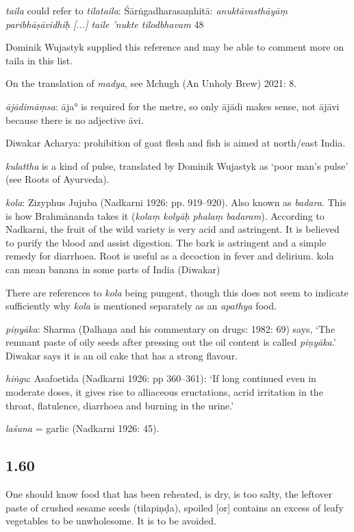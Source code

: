 \begin{ekdosis}
\begin{philcomm}[hp01_059]
\emph{taila} could refer to \emph{tilataila}:
Śārṅgadharasaṃhitā:
\emph{anuktāvasthāyāṃ paribhāṣāvidhiḥ [...] taile ’nukte tilodbhavam} 48

Dominik Wujastyk supplied this reference and may be able to comment more on taila in this list.

On the translation of \emph{madya}, see Mchugh (An Unholy Brew) 2021: 8.

\emph{ājādimāṃsa}: āja° is required for the metre, so only ājādi makes sense, not ājāvi because there is no adjective āvi.

Diwakar Acharya: prohibition of goat flesh and fish is aimed at north/east India.

\emph{kulattha} is a kind of pulse, translated by Dominik Wujastyk as `poor man's pulse' (see Roots of Ayurveda).

\emph{kola}: Zizyphus Jujuba (Nadkarni 1926: pp. 919--920). Also known as \emph{badara}. This is how Brahmānanda takes it (\emph{kolaṃ kolyāḥ phalaṃ badaram}). According to Nadkarni, the fruit of the wild variety is very acid and astringent. It is believed to purify the blood and assist digestion. The bark is astringent and a simple remedy for diarrhoea. Root is useful as a decoction in fever and delirium.
kola can mean banana in some parts of India (Diwakar)

There are references to \emph{kola} being pungent, though this does not seem to indicate sufficiently why \emph{kola} is mentioned separately as an \emph{apathya} food.

\emph{piṇyāka}: Sharma (Ḍalhaṇa and his commentary on drugs: 1982: 69) says, ‘The remnant paste of oily seeds after pressing out the oil content is called \emph{piṇyāka}.’ Diwakar says it is an oil cake that has a strong flavour.

\emph{hiṅgu}: Asafoetida (Nadkarni 1926: pp 360–361): `If long continued even in moderate doses, it gives rise to alliaceous eructations, acrid irritation in the throat, flatulence, diarrhoea and burning in the urine.'

\emph{laśuna} = garlic (Nadkarni 1926: 45).
\end{philcomm}

\subsection*{1.60}
\begin{translation}[hp01_060]
One should know food that has been reheated, is dry, is too salty, the leftover paste of crushed sesame seeds (tilapiṇḍa), spoiled [or] contains an excess of leafy vegetables to be unwholesome. It is to be avoided.
\end{translation}


\end{ekdosis}
